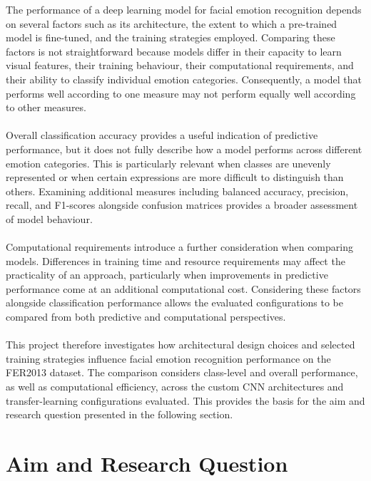 \documentclass[12pt, a4paper]{report}
\let\oldsection\section
\renewcommand{\section}{%
    \Needspace{6\baselineskip}%
    \oldsection
}
\begin{document}
			The performance of a deep learning model for facial emotion recognition depends on several factors such as its architecture, the extent to which a pre-trained model is fine-tuned, and the training strategies employed. Comparing these factors is not straightforward because models differ in their capacity to learn visual features, their training behaviour, their computational requirements, and their ability to classify individual emotion categories. Consequently, a model that performs well according to one measure may not perform equally well according to other measures.\\\\
			Overall classification accuracy provides a useful indication of predictive performance, but it does not fully describe how a model performs across different emotion categories. This is particularly relevant when classes are unevenly represented or when certain expressions are more difficult to distinguish than others. Examining additional measures including balanced accuracy, precision, recall, and F1-scores alongside confusion matrices provides a broader assessment of model behaviour.\\\\
			Computational requirements introduce a further consideration when comparing models. Differences in training time and resource requirements may affect the practicality of an approach, particularly when improvements in predictive performance come at an additional computational cost. Considering these factors alongside classification performance allows the evaluated configurations to be compared from both predictive and computational perspectives.\\\\
			This project therefore investigates how architectural design choices and selected training strategies influence facial emotion recognition performance on the FER2013 dataset. The comparison considers class-level and overall performance, as well as computational efficiency, across the custom CNN architectures and transfer-learning configurations evaluated. This provides the basis for the aim and research question presented in the following section.
			
		\section{Aim and Research Question}
			
\end{document}
